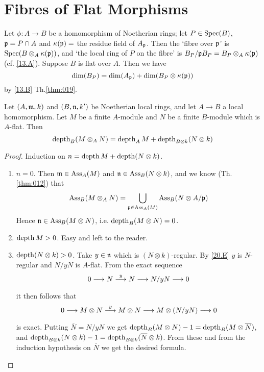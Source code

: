 \documentclass[../main]{subfiles}
\begin{document}
\section{Fibres of Flat Morphisms}\label{sec:21}

\newparagraph Let $\phi : A \longrightarrow B$ be a homomorphism of Noetherian rings; let $P \in \operatorname{Spec}(B)$, $\mathfrak{p} = P \cap A$ and $\kappa(\mathfrak{p}) = $ the residue field of $A_{\mathfrak{p}}$. Then the `fibre over $\mathfrak{p}$' is $\operatorname{Spec}(B \otimes_A \kappa(\mathfrak{p}))$, and `the local ring of $P$ on the fibre' is $B_P/\mathfrak{p} B_P = B_P \otimes_A \kappa(\mathfrak{p})$ (cf. \ref{13.A}). Suppose $B$ is flat over $A$. Then we have
\[
\operatorname{dim}(B_P) = \operatorname{dim}(A_{\mathfrak{p}}) + \operatorname{dim}(B_P \otimes \kappa(\mathfrak{p}))
\]
by \ref{13.B} Th.\ref{thm:019}.

\begin{partheorem}\label{thm:050}
Let $(A, \mathfrak{m}, k)$ and $(B, \mathfrak{n}, k')$ be Noetherian local rings, and let $A \longrightarrow B$ a local homomorphism. Let $M$ be a finite $A$-module and $N$ be a finite $B$-module which is $A$-flat. Then
\[
\operatorname{depth}_B(M \otimes_A N) = \operatorname{depth}_A  M + \operatorname{depth}_{B \otimes k} (N \otimes k)
\]
\end{partheorem}

\begin{proof}
Induction on $n = \operatorname{depth}  M + \operatorname{depth} (N \otimes k)$. 
\begin{enumerate}[label = Case \arabic*.]
    \item $n = 0$. Then $\mathfrak{m} \in \operatorname{Ass}_A(M)$ and $\mathfrak{n} \in \operatorname{Ass}_B(N \otimes k)$, and we know (Th.\ref{thm:012}) that
    \[
    \operatorname{Ass}_B(M \otimes_A N) = \bigcup_{\mathfrak{p} \in \operatorname{Ass}_A(M)} \operatorname{Ass}_B(N \otimes A/\mathfrak{p})
    \]
    Hence $\mathfrak{n} \in \operatorname{Ass}_B(M \otimes N)$, i.e. $\operatorname{depth}_B(M \otimes N) = 0$. 
    \item $\operatorname{depth}  M > 0$. Easy and left to the reader. 
    \item $\operatorname{depth}(N \otimes k) > 0$. Take $y \in \mathfrak{n}$ which is $(N \otimes k)$-regular. By \ref{20.E} $y$ is $N$-regular and $N/y N$ is $A$-flat. From the exact sequence \[0 \varrightarrow{} N \varrightarrow{y} N \varrightarrow{} N/y N \varrightarrow{} 0\] it then follows that
    \[
    0 \varrightarrow{} M \otimes N \varrightarrow{y} M \otimes N \varrightarrow{} M \otimes (N/y N) \varrightarrow{} 0
    \]
    is exact. Putting $\overline N = N/y N$ we get $\operatorname{depth}_B(M \otimes N) - 1 = \operatorname{depth}_B(M \otimes \overline N)$, and $\operatorname{depth}_{B \otimes k} (N \otimes k) - 1 = \operatorname{depth}_{B \otimes k} (\overline N \otimes k)$. From these and from the induction hypothesis on $\overline N$ we get the desired formula. 
\end{enumerate}
\end{proof}
\end{document}
